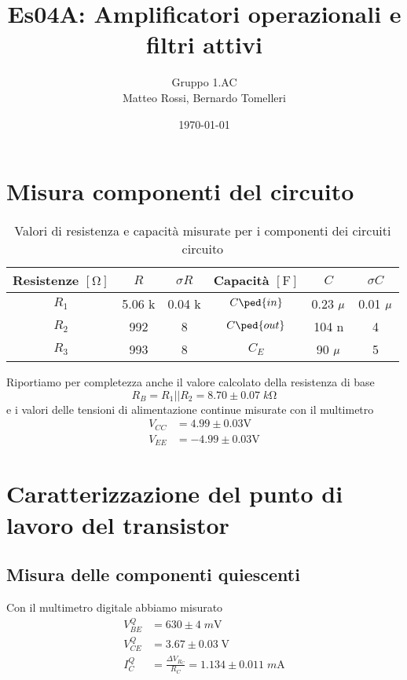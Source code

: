 \documentclass[10pt,a4paper]{article}
\author{Gruppo 1.AC \\ Matteo Rossi, Bernardo Tomelleri}
\title{Es04A: Amplificatori operazionali e filtri attivi}
\begin{document}
\date{\today}
\maketitle

\setcounter{section}{0}

\section*{Misura componenti del circuito}
\begin{table}[ht]
\centering
\begin{tabular}{cccccc}
\toprule
Resistenze $[\si{\ohm}]$ & $R$ & $\sigma R$ & Capacità $[\si{\F}]$ & $C$ &
$\sigma C$ \\
\midrule
\midrule
$R_1$		  & 5.06 k	& 0.04 k & $C\ped{in}$  & 0.23 $\rm \mu$ & 0.01 $\rm \mu$ \\
$R_2$	  & 992		& 8      & $C\ped{out}$ & 104 n			 & 4	\\
$R_3$	  & 993		& 8      & $C_E$        & 90 $\rm \mu$	 & 5	\\
\bottomrule     
\end{tabular}
\caption{Valori di resistenza e capacità misurate per i componenti dei circuiti circuito \label{tab: rcmes}}
\end{table}
Riportiamo per completezza anche il valore calcolato della resistenza di base
\[
R_B = R_1 || R_2 = 8.70 \pm 0.07 \; \si{k\ohm}
\]
e i valori delle tensioni di alimentazione continue misurate con il multimetro
\begin{align*}
V_{CC} &= 4.99 \pm 0.03 \si{\V} \\
V_{EE} &= -4.99 \pm 0.03 \si{\V}
\end{align*}
\section{Caratterizzazione del punto di lavoro del transistor}
\subsection{Misura delle componenti quiescenti}
Con il multimetro digitale abbiamo misurato
\begin{align*}
V_{BE}^Q &= 630 \pm 4 \; \si{m\V} \\
V_{CE}^Q &= 3.67 \pm 0.03 \; \si{\V} \\
I_C^Q &= \frac{\Delta V_{R_C}}{R_C} = 1.134 \pm 0.011 \; \si{m\A} \\
\end{align*}
\end{document}
